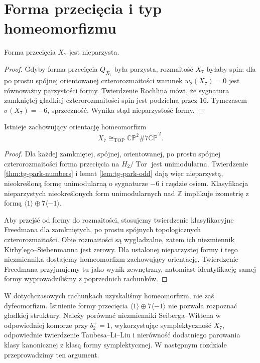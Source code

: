 \section{Forma przecięcia i typ homeomorfizmu}
\label{sec:tg-park-homeo}

\begin{lemat}
\label{lem:tg-park-odd}
Forma przecięcia $X_7$ jest nieparzysta.
\end{lemat}

\begin{proof}
Gdyby forma przecięcia $Q_{X_7}$ była parzysta,
rozmaitość $X_7$ byłaby spin: dla po prostu spójnej
orientowanej czterorozmaitości warunek
$w_2(X_7)=0$ jest równoważny parzystości formy.
Twierdzenie Rochlina mówi, że sygnatura zamkniętej
gładkiej czterorozmaitości spin jest podzielna przez $16$.
Tymczasem $\sigma(X_7)=-6$, sprzeczność.
Wynika stąd nieparzystość formy.
\end{proof}

\begin{twierdzenie}
\label{thm:tg-park-homeo}
Istnieje zachowujący orientację homeomorfizm
\[
X_7\cong_{\mathrm{TOP}}
\mathbb{CP}^{2}\#7\overline{\mathbb{CP}}^{\,2}.
\]
\end{twierdzenie}

\begin{proof}
Dla każdej zamkniętej, spójnej, orientowanej, po prostu
spójnej czterorozmaitości forma przecięcia na
$H_2/\operatorname{Tor}$ jest unimodularna.
Twierdzenie \ref{thm:tg-park-numbers} i lemat
\ref{lem:tg-park-odd} dają więc nieparzystą,
nieokreśloną formę unimodularną o sygnaturze $-6$
i rzędzie osiem. Klasyfikacja nieparzystych
nieokreślonych form unimodularnych nad $\mathbb Z$
implikuje izometrię z formą
$\langle1\rangle\oplus7\langle-1\rangle$.

Aby przejść od formy do rozmaitości, stosujemy twierdzenie
klasyfikacyjne Freedmana dla zamkniętych, po prostu
spójnych topologicznych czterorozmaitości.
Obie rozmaitości są wygładzalne, zatem ich niezmiennik
Kirby'ego--Siebenmanna jest zerowy. Dla ustalonej
nieparzystej formy i tego niezmiennika dostajemy
homeomorfizm zachowujący orientację.
Twierdzenie Freedmana przyjmujemy tu jako wynik
zewnętrzny, natomiast identyfikację samej formy
wyprowadziliśmy z poprzednich rachunków.
\end{proof}

\begin{uwaga}
W dotychczasowych rachunkach uzyskaliśmy homeomorfizm,
nie zaś dyfeomorfizm. Istnienie formy przecięcia
$\langle1\rangle\oplus7\langle-1\rangle$ nie pozwala
rozpoznać gładkiej struktury. Należy porównać
niezmienniki Seiberga--Wittena w odpowiedniej komorze
przy $b_2^+=1$, wykorzystując symplektyczność $X_7$,
odpowiednie twierdzenie Taubesa--Li--Liu i nierówność
dodatniego parowania klasy kanonicznej z klasą formy
symplektycznej. W następnym rozdziale przeprowadzimy ten argument.
\end{uwaga}

